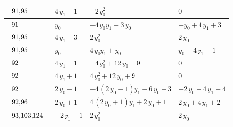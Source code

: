 \begin{table}[H]
\begin{center}
{\begin{tabular}{|l|l|l|l|}
$\begin{tabular}{l}
91,95 \\
\end{tabular}$ & $ 4 \, y_{1} - 1 $ & $ -2 \, y_{0}^{2} $ & $ 0 $ \\ \hline
$\begin{tabular}{l}
91 \\
\end{tabular}$ & $ y_{0} $ & $ -4 \, y_{0} y_{1} - 3 \, y_{0} $ & $ -y_{0} + 4 \, y_{1} + 3 $ \\ \hline
$\begin{tabular}{l}
91,95 \\
\end{tabular}$ & $ 4 \, y_{1} - 3 $ & $ 2 \, y_{0}^{2} $ & $ 2 \, y_{0} $ \\ \hline
$\begin{tabular}{l}
91,95 \\
\end{tabular}$ & $ y_{0} $ & $ 4 \, y_{0} y_{1} + y_{0} $ & $ y_{0} + 4 \, y_{1} + 1 $ \\ \hline
$\begin{tabular}{l}
92 \\
\end{tabular}$ & $ 4 \, y_{1} - 1 $ & $ -4 \, y_{0}^{2} + 12 \, y_{0} - 9 $ & $ 0 $ \\ \hline
$\begin{tabular}{l}
92 \\
\end{tabular}$ & $ 4 \, y_{1} + 1 $ & $ 4 \, y_{0}^{2} + 12 \, y_{0} + 9 $ & $ 0 $ \\ \hline
$\begin{tabular}{l}
92 \\
\end{tabular}$ & $ 2 \, y_{0} - 1 $ & $ -4 \, {\left(2 \, y_{0} - 1\right)} y_{1} - 6 \, y_{0} + 3 $ & $ -2 \, y_{0} + 4 \, y_{1} + 4 $ \\ \hline
$\begin{tabular}{l}
92,96 \\
\end{tabular}$ & $ 2 \, y_{0} + 1 $ & $ 4 \, {\left(2 \, y_{0} + 1\right)} y_{1} + 2 \, y_{0} + 1 $ & $ 2 \, y_{0} + 4 \, y_{1} + 2 $ \\ \hline
$\begin{tabular}{l}
93,103,124 \\
\end{tabular}$ & $ -2 \, y_{1} - 1 $ & $ 2 \, y_{0}^{2} $ & $ 2 \, y_{0} $ \\ \hline

\end{tabular}}
\end{center}
\end{table}
